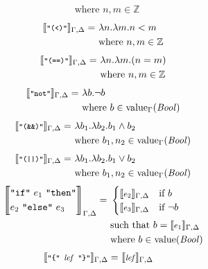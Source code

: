 \documentclass[]{scrbook}
\newcommand{\mf}[1]{\text{\texttt{#1}}}
\newcommand{\semantic}[1]{\llbracket \text{\footnotesize\texttt{#1}} \rrbracket}
\theoremstyle{definition}
\theoremstyle{definition}
\theoremstyle{definition}
\theoremstyle{remark}
\begin{document}
\[\begin{aligned}
    & \text{where } n,m\in\mathbb{Z}
\end{aligned}
\] \[
\begin{aligned}
\semantic{"(<)"}_{\Gamma,\Delta} =\ & \lambda n.\lambda m. n < m\\
    & \text{where } n,m\in\mathbb{Z}
\end{aligned}
\] \[
\begin{aligned}
\semantic{"(==)"}_{\Gamma,\Delta} =\ & \lambda n.\lambda m. (n = m)\\
    & \text{where } n,m\in\mathbb{Z}
\end{aligned}
\] \[
\begin{aligned}
\semantic{"not"}_{\Gamma,\Delta} =\ & \lambda b. \neg b\\
    & \text{where }b\in\text{value}_\Gamma(\mathit{Bool})
\end{aligned}
\] \[
\begin{aligned}
\semantic{"(\&\&)"}_{\Gamma,\Delta} =\ & \lambda b_1.\lambda b_2. b_1 \land b_2\\
    & \text{where }b_1,n_2\in\text{value}_\Gamma(\mathit{Bool})
\end{aligned}
\] \[
\begin{aligned}
\semantic{"(||)"}_{\Gamma,\Delta} =\ & \lambda b_1.\lambda b_2. b_1 \lor b_2\\
    & \text{where }b_1,n_2\in\text{value}_\Gamma(\mathit{Bool})
\end{aligned}
\] \[
\begin{aligned}
 \Bigg\llbracket\begin{aligned}
 &\mf{"if"} \ e_1\ \mf{"then"}\\
 & e_2\ \mf{"else"}\ e_3
 \end{aligned}\Bigg\rrbracket_{\Gamma,\Delta} =\ & 
      \begin{cases}
        \semantic{$e_2$}_{\Gamma,\Delta} & \text{if } b\\
        \semantic{$e_3$}_{\Gamma,\Delta} & \text{if } \neg b
      \end{cases}\\
    & \text{such that } b = \semantic{$e_1$}_{\Gamma,\Delta}\\ 
    & \text{where } b\in\text{value}(\mathit{Bool})
\end{aligned}
\] \[
\begin{aligned}
\semantic{"\{" $\mathit{lef}$ "\}"}_{\Gamma,\Delta} =\ & \semantic{$\mathit{lef}$}_{\Gamma,\Delta}
 \end{aligned}
\] \[
\begin{aligned}

\end{aligned}\]
\end{document}
